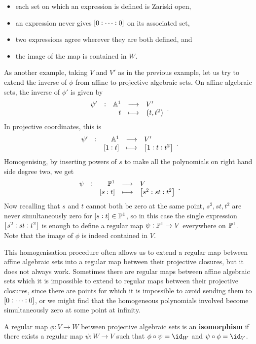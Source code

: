 \pagebreak

\begin{itemize}
\item each set on which an expression is defined is Zariski open,
\item an expression never gives $ \sbr{0 : \dots : 0} $ on its associated set,
\item two expressions agree wherever they are both defined, and
\item the image of the map is contained in $ W $.
\end{itemize}

\begin{example*}
As another example, taking $ V $ and $ V' $ as in the previous example, let us try to extend the inverse of $ \phi $ from affine to projective algebraic sets. On affine algebraic sets, the inverse of $ \phi' $ is given by
$$ \function[\psi']{\AA^1}{V'}{t}{\br{t, t^2}}. $$
In projective coordinates, this is
$$ \function[\psi']{\AA^1}{V'}{\sbr{1 : t}}{\sbr{1 : t : t^2}}. $$
Homogenising, by inserting powers of $ s $ to make all the polynomials on right hand side degree two, we get
$$ \function[\psi]{\PP^1}{V}{\sbr{s : t}}{\sbr{s^2 : st : t^2}}. $$
Now recalling that $ s $ and $ t $ cannot both be zero at the same point, $ s^2, st, t^2 $ are never simultaneously zero for $ \sbr{s : t} \in \PP^1 $, so in this case the single expression $ \sbr{s^2 : st : t^2} $ is enough to define a regular map $ \psi : \mathbb{P}^1 \to V $ everywhere on $ \mathbb{P}^1 $. Note that the image of $ \phi $ is indeed contained in $ V $.
\end{example*}

\begin{note*}
This homogenisation procedure often allows us to extend a regular map between affine algebraic sets into a regular map between their projective closures, but it does not always work. Sometimes there are regular maps between affine algebraic sets which it is impossible to extend to regular maps between their projective closures, since there are points for which it is impossible to avoid sending them to $ \sbr{0 : \dots : 0} $, or we might find that the homogeneous polynomials
involved become simultaneously zero at some point at infinity.
\end{note*}


\begin{definition*}
A regular map $ \phi : V \to W $ between projective algebraic sets is an \textbf{isomorphism} if there exists a regular map $ \psi : W \to V $ such that $ \phi \circ \psi = \id_W $ and $ \psi \circ \phi = \id_V $.
\end{definition*}

